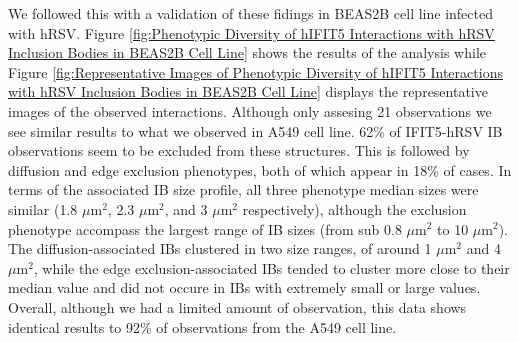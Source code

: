 We followed this with a validation of these fidings in BEAS2B cell line infected with hRSV. Figure \ref{fig:Phenotypic Diversity of hIFIT5 Interactions with hRSV Inclusion Bodies in BEAS2B Cell Line} shows the results of the analysis while Figure \ref{fig:Representative Images of Phenotypic Diversity of hIFIT5 Interactions with hRSV Inclusion Bodies in BEAS2B Cell Line} displays the representative images of the observed interactions. Although only assesing 21 observations we see similar results to what we observed in A549 cell line. 62\% of IFIT5-hRSV IB observations seem to be excluded from these structures. This is followed by diffusion and edge exclusion phenotypes, both of which appear in 18\% of cases. In terms of the associated IB size profile, all three phenotype median sizes were similar (1.8 \(\mu \mbox{m}^2\), 2.3 \(\mu \mbox{m}^2\), and 3 \(\mu \mbox{m}^2\) respectively), although the exclusion phenotype accompass the largest range of IB sizes (from sub 0.8 \(\mu \mbox{m}^2\) to 10 \(\mu \mbox{m}^2\)). The diffusion-associated IBs clustered in two size ranges, of around 1 \(\mu \mbox{m}^2\) and 4 \(\mu \mbox{m}^2\), while the edge exclusion-associated IBs tended to cluster more close to their median value and did not occure in IBs with extremely small or large values. Overall, although we had a limited amount of observation, this data shows identical results to 92\% of observations from the A549 cell line.

